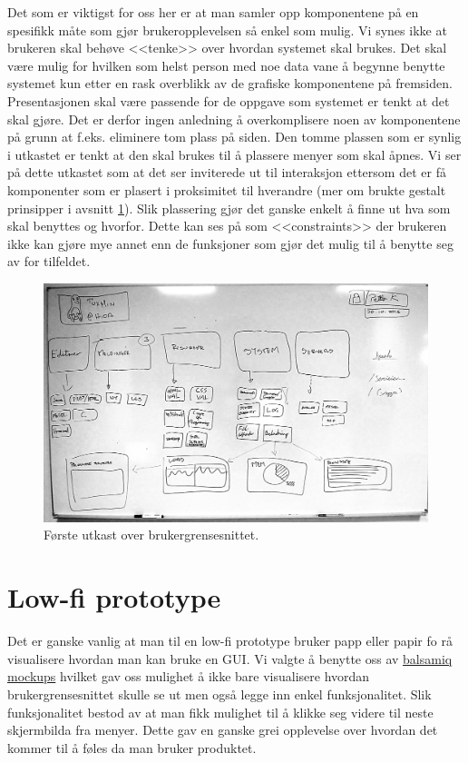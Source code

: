 Det som er viktigst for oss her er at man samler opp komponentene på en spesifikk måte som gjør brukeropplevelsen så enkel som mulig. Vi synes ikke at brukeren skal behøve <<tenke>> over hvordan systemet skal brukes. Det skal være mulig for hvilken som helst person med noe data vane å begynne benytte systemet kun etter en rask overblikk av de grafiske komponentene på fremsiden.
Presentasjonen skal være passende for de oppgave som systemet er tenkt at det skal gjøre. Det er derfor ingen anledning å overkomplisere noen av komponentene på grunn at f.eks. eliminere tom plass på siden. Den tomme plassen som er synlig i utkastet er tenkt at den skal brukes til å plassere menyer som skal åpnes. Vi ser på dette utkastet som at det ser inviterede ut til interaksjon ettersom det er få komponenter som er plasert i proksimitet til hverandre (mer om brukte gestalt prinsipper i avsnitt \ref{sec:lowfi}). Slik plassering gjør det ganske enkelt å finne ut hva som skal benyttes og hvorfor. Dette kan ses på som <<constraints>> der brukeren ikke kan gjøre mye annet enn de funksjoner som gjør det mulig til å benytte seg av for tilfeldet.\cite{nielsen2000designing}



\begin{figure}
\includegraphics[width=\textwidth,height=\textheight,keepaspectratio]{./img/prosessdokumentasjon/foersteutkast/foerste.jpg}
\caption[Første utkast]{Første utkast over brukergrensesnittet.}
\label{fig:foersteutkast}
\end{figure}

\section{Low-fi prototype} \label{sec:lowfi}
Det er ganske vanlig at man til en low-fi prototype bruker papp eller papir fo rå visualisere hvordan man kan bruke en GUI. Vi valgte å benytte oss av \href{http://balsamiq.com/products/mockups/}{balsamiq mockups} hvilket gav oss mulighet å ikke bare visualisere hvordan brukergrensesnittet skulle se ut men også legge inn enkel funksjonalitet. Slik funksjonalitet bestod av at man fikk mulighet til å klikke seg videre til neste skjermbilda fra menyer. Dette gav en ganske grei opplevelse over hvordan det kommer til å føles da man bruker produktet.


